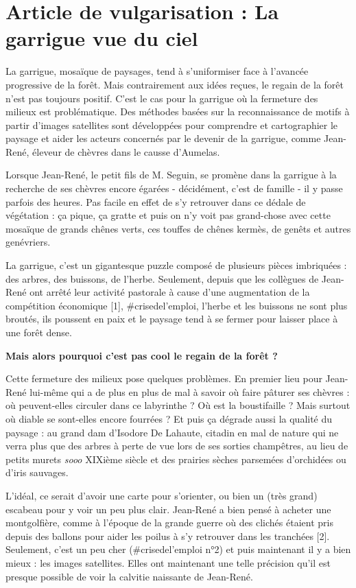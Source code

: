 \chapter{Article de vulgarisation : La garrigue vue du ciel} \label{vulgarisation}

\newpage
\newpage

La garrigue, mosaïque de paysages, tend à s'uniformiser face à l'avancée progressive de la forêt. Mais contrairement aux idées reçues, le regain de la forêt n'est pas toujours positif. C'est le cas pour la garrigue où la fermeture des milieux est problématique. Des méthodes basées sur la reconnaissance de motifs à partir d'images satellites sont développées pour comprendre et cartographier le paysage et aider les acteurs concernés par le devenir de la garrigue, comme Jean-René, éleveur de chèvres dans le causse d'Aumelas.

Lorsque Jean-René, le petit fils de M. Seguin, se promène dans la garrigue à la recherche de ses chèvres encore égarées - décidément, c'est de famille - il y passe parfois des heures. Pas facile en effet de s'y retrouver dans ce dédale de végétation : ça pique, ça gratte et puis on n'y voit pas grand-chose avec cette mosaïque de grands chênes verts, ces touffes de chênes kermès, de genêts et autres genévriers.

La garrigue, c'est un gigantesque puzzle composé de plusieurs pièces imbriquées : des arbres, des buissons, de l'herbe. Seulement, depuis que les collègues de Jean-René ont arrêté leur activité pastorale à cause d'une augmentation de la compétition économique [1], \#crisedel'emploi, l'herbe et les buissons ne sont plus broutés, ils poussent en paix et le paysage tend à se fermer pour laisser place à une forêt dense.

\textbf{Mais alors pourquoi c'est pas cool le regain de la forêt ?}


Cette fermeture des milieux pose quelques problèmes. En premier lieu pour Jean-René lui-même qui a de plus en plus de mal à savoir où faire pâturer ses chèvres : où peuvent-elles circuler dans ce labyrinthe ? Où est la boustifaille ? Mais surtout où diable se sont-elles encore fourrées ? Et puis ça dégrade aussi la qualité du paysage : au grand dam d'Isodore De Lahaute, citadin en mal de nature qui ne verra plus que des arbres à perte de vue lors de ses sorties champêtres, au lieu de petits murets \emph{sooo} XIXième siècle et des prairies sèches parsemées d'orchidées ou d'iris sauvages.

L'idéal, ce serait d'avoir une carte pour s'orienter, ou bien un (très grand) escabeau pour y voir un peu plus clair. Jean-René a bien pensé à acheter une montgolfière, comme à l'époque de la grande guerre où des clichés étaient pris depuis des ballons pour aider les poilus à s'y retrouver dans les tranchées [2]. Seulement, c'est un peu cher (\#crisedel'emploi n°2) et puis maintenant il y a bien mieux : les images satellites. Elles ont maintenant une telle précision qu'il est presque possible de voir la calvitie naissante de Jean-René.

